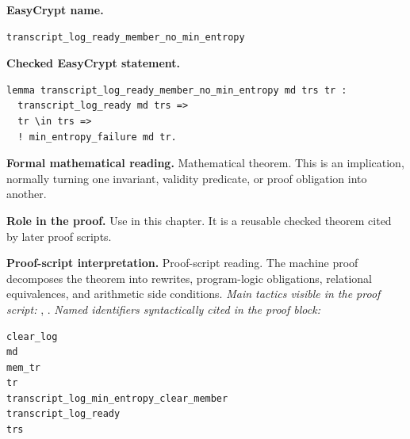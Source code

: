 \begin{formaltheorem}
\noindent\textbf{EasyCrypt name.}
\begin{lstlisting}[language=EasyCrypt,basicstyle=\ttfamily\scriptsize]
transcript_log_ready_member_no_min_entropy
\end{lstlisting}
\noindent\textbf{Checked EasyCrypt statement.}
\begin{lstlisting}[language=EasyCrypt,basicstyle=\ttfamily\scriptsize]
lemma transcript_log_ready_member_no_min_entropy md trs tr :
  transcript_log_ready md trs =>
  tr \in trs =>
  ! min_entropy_failure md tr.
\end{lstlisting}
\noindent\textbf{Formal mathematical reading.}
Mathematical theorem. This is an implication, normally turning one invariant, validity predicate, or proof obligation into another.

\noindent\textbf{Role in the proof.}
Use in this chapter. It is a reusable checked theorem cited by later proof scripts.

\noindent\textbf{Proof-script interpretation.}
Proof-script reading. The machine proof decomposes the theorem into rewrites, program-logic obligations, relational equivalences, and arithmetic side conditions.
\emph{Main tactics visible in the proof script:} , .
\emph{Named identifiers syntactically cited in the proof block:}
\begin{lstlisting}[language=EasyCrypt,basicstyle=\ttfamily\scriptsize]
clear_log
md
mem_tr
tr
transcript_log_min_entropy_clear_member
transcript_log_ready
trs
\end{lstlisting}

\end{formaltheorem}


